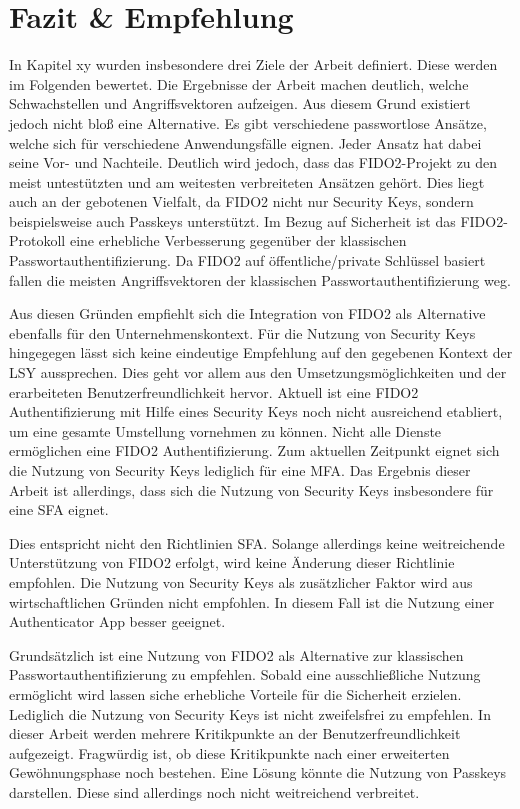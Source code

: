 
\chapter{Fazit \& Empfehlung}
In Kapitel xy wurden insbesondere drei Ziele der Arbeit definiert. Diese werden im Folgenden bewertet. 
Die Ergebnisse der Arbeit machen deutlich, welche Schwachstellen und Angriffsvektoren aufzeigen. Aus diesem Grund existiert jedoch nicht bloß eine Alternative. Es gibt verschiedene passwortlose Ansätze, welche sich für verschiedene Anwendungsfälle eignen. Jeder Ansatz hat dabei seine Vor- und Nachteile. Deutlich wird jedoch, dass das FIDO2-Projekt zu den meist untestützten und am weitesten verbreiteten Ansätzen gehört. Dies liegt auch an der gebotenen Vielfalt, da FIDO2 nicht nur Security Keys, sondern beispielsweise auch Passkeys unterstützt.
Im Bezug auf Sicherheit ist das FIDO2-Protokoll eine erhebliche Verbesserung gegenüber der klassischen Passwortauthentifizierung. Da FIDO2 auf öffentliche/private Schlüssel basiert fallen die meisten Angriffsvektoren der klassischen Passwortauthentifizierung weg. 

Aus diesen Gründen empfiehlt sich die Integration von FIDO2 als Alternative ebenfalls für den Unternehmenskontext. Für die Nutzung von Security Keys hingegegen lässt sich keine eindeutige Empfehlung auf den gegebenen Kontext der \ac{LSY} aussprechen. Dies geht vor allem aus den Umsetzungsmöglichkeiten und der erarbeiteten Benutzerfreundlichkeit hervor. Aktuell ist eine FIDO2 Authentifizierung mit Hilfe eines Security Keys noch nicht ausreichend etabliert, um eine gesamte Umstellung vornehmen zu können. Nicht alle Dienste ermöglichen eine FIDO2 Authentifizierung. Zum aktuellen Zeitpunkt eignet sich die Nutzung von Security Keys lediglich für eine \ac{MFA}. Das Ergebnis dieser Arbeit ist allerdings, dass sich die Nutzung von Security Keys insbesondere für eine \ac{SFA} eignet.

Dies entspricht nicht den Richtlinien \ac{SFA}. Solange allerdings keine weitreichende Unterstützung von FIDO2 erfolgt, wird keine Änderung dieser Richtlinie empfohlen. Die Nutzung von Security Keys als zusätzlicher Faktor wird aus wirtschaftlichen Gründen nicht empfohlen. In diesem Fall ist die Nutzung einer Authenticator App besser geeignet.

Grundsätzlich ist eine Nutzung von FIDO2 als Alternative zur klassischen Passwortauthentifizierung zu empfehlen. Sobald eine ausschließliche Nutzung ermöglicht wird lassen siche erhebliche Vorteile für die Sicherheit erzielen. Lediglich die Nutzung von Security Keys ist nicht zweifelsfrei zu empfehlen. In dieser Arbeit werden mehrere Kritikpunkte an der Benutzerfreundlichkeit aufgezeigt. Fragwürdig ist, ob diese Kritikpunkte nach einer erweiterten Gewöhnungsphase noch bestehen. Eine Lösung könnte die Nutzung von Passkeys darstellen. Diese sind allerdings noch nicht weitreichend verbreitet.

